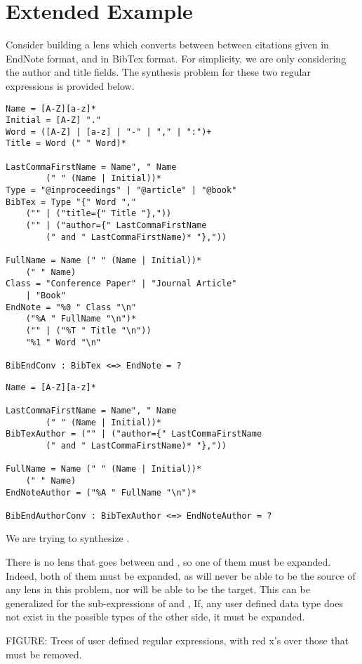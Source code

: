\section{Extended Example}

Consider building a lens which converts between between citations given
in EndNote format, and in BibTex format.  For simplicity, we are only
considering the author and title fields.  The synthesis problem for these
two regular expressions is provided below.

\begin{lstlisting}
Name = [A-Z][a-z]*
Initial = [A-Z] "."
Word = ([A-Z] | [a-z] | "-" | "," | ":")+
Title = Word (" " Word)*

LastCommaFirstName = Name", " Name
		(" " (Name | Initial))*
Type = "@inproceedings" | "@article" | "@book"
BibTex = Type "{" Word ","
	("" | ("title={" Title "},"))
	("" | ("author={" LastCommaFirstName
		(" and " LastCommaFirstName)* "},"))

FullName = Name (" " (Name | Initial))*
	(" " Name)
Class = "Conference Paper" | "Journal Article"
	| "Book"
EndNote = "%0 " Class "\n"
	("%A " FullName "\n")*
	("" | ("%T " Title "\n"))
	"%1 " Word "\n"

BibEndConv : BibTex <=> EndNote = ?
\end{lstlisting}

\begin{lstlisting}
Name = [A-Z][a-z]*

LastCommaFirstName = Name", " Name
		(" " (Name | Initial))*
BibTexAuthor = ("" | ("author={" LastCommaFirstName
		(" and " LastCommaFirstName)* "},"))

FullName = Name (" " (Name | Initial))*
	(" " Name)
EndNoteAuthor = ("%A " FullName "\n")*

BibEndAuthorConv : BibTexAuthor <=> EndNoteAuthor = ?
\end{lstlisting}


We are trying to synthesize \BibEndConv{}.

There is no lens that goes between \BibTex{} and \EndNote{}, so one of them must
be expanded.
Indeed, both of them must be expanded, as \BibTex{} will never be able to be
the source of any lens in this problem, nor will \EndNote{} be able to be the
target.
This can be generalized for the sub-expressions of \BibTex{} and \EndNote{},  
If, any user defined data type does not exist in the possible types of the
other side, it must be expanded.

FIGURE:
Trees of user defined regular expressions, with red x's over those that must be
removed.

